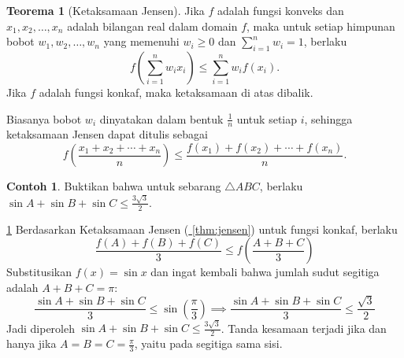 \documentclass[aspectratio=169]{beamer}
\theoremstyle{definition}
\newtheorem{teorema}{Teorema}
\newtheorem{contoh}{Contoh}
\newcommand{\myref}[1]{\hyperref[#1]{\nameCref{#1} \ref*{#1}}}
\begin{document}
\begin{frame}{\insertsection}{\insertsubsection}
  \begin{teorema}[Ketaksamaan Jensen\label{thm:jensen}]
    Jika $f$ adalah fungsi konveks dan $x_1, x_2, \ldots, x_n$ adalah bilangan real dalam domain $f$, maka untuk setiap himpunan bobot $w_1, w_2, \ldots, w_n$ yang memenuhi $w_i \geq 0$ dan $\sum_{i=1}^n w_i = 1$, berlaku
    \[
      f\left(\sum_{i=1}^n w_i x_i\right) \leq \sum_{i=1}^n w_i f(x_i).
    \]
    Jika $f$ adalah fungsi konkaf, maka ketaksamaan di atas dibalik.
  \end{teorema}
  Biasanya bobot $w_i$ dinyatakan dalam bentuk $\frac{1}{n}$ untuk setiap $i$, sehingga ketaksamaan Jensen dapat ditulis sebagai
  \[
    f\left(\frac{x_1 + x_2 + \cdots + x_n}{n}\right) \leq \frac{f(x_1) + f(x_2) + \cdots + f(x_n)}{n}.
  \]
\end{frame}
\begin{frame}{\insertsection}{\insertsubsection}
  \begin{contoh}
    Buktikan bahwa untuk sebarang $\triangle ABC$, berlaku $\sin A + \sin B + \sin C \le \frac{3\sqrt{3}}{2}$.\label{cth:jensen}

  \end{contoh}
\end{frame}
\begin{frame}{\insertsection}{\insertsubsection}
  \begin{exampleblock}{\myref{cth:jensen}}
    Berdasarkan Ketaksamaan Jensen (\myref{thm:jensen}) untuk fungsi konkaf, berlaku
    $$\frac{f(A) + f(B) + f(C)}{3} \le f\left(\frac{A + B + C}{3}\right)$$
    Substitusikan $f(x) = \sin x$ dan ingat kembali bahwa jumlah sudut segitiga adalah $A + B + C = \pi$:
    $$\frac{\sin A + \sin B + \sin C}{3} \le \sin\left(\frac{\pi}{3}\right)\implies\frac{\sin A + \sin B + \sin C}{3} \le \frac{\sqrt{3}}{2}$$
    Jadi diperoleh $\sin A + \sin B + \sin C \le \frac{3\sqrt{3}}{2}$.
    Tanda kesamaan terjadi jika dan hanya jika $A = B = C = \frac{\pi}{3}$, yaitu pada segitiga sama sisi.
  \end{exampleblock}
\end{frame}
\end{document}
